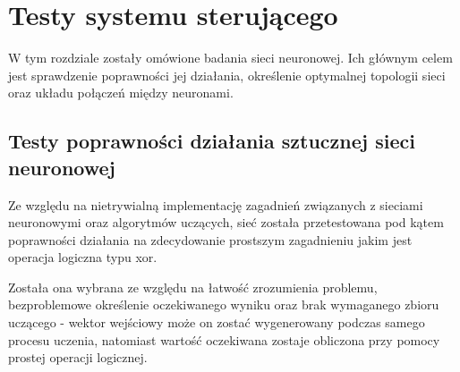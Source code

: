 \chapter{Testy systemu sterującego}
\label{cha:testy}

W tym rozdziale zostały omówione badania sieci neuronowej. Ich głównym celem jest sprawdzenie poprawności jej działania, określenie optymalnej topologii sieci oraz układu połączeń między neuronami.

\section{Testy poprawności działania sztucznej sieci neuronowej}

Ze względu na nietrywialną implementację zagadnień związanych z sieciami neuronowymi oraz algorytmów uczących, sieć została przetestowana pod kątem poprawności działania na zdecydowanie prostszym zagadnieniu jakim jest operacja logiczna typu xor.

Została ona wybrana ze względu na łatwość zrozumienia problemu, bezproblemowe określenie oczekiwanego wyniku oraz brak wymaganego zbioru uczącego - wektor wejściowy może on zostać wygenerowany podczas samego procesu uczenia, natomiast wartość oczekiwana zostaje obliczona przy pomocy prostej operacji logicznej. 